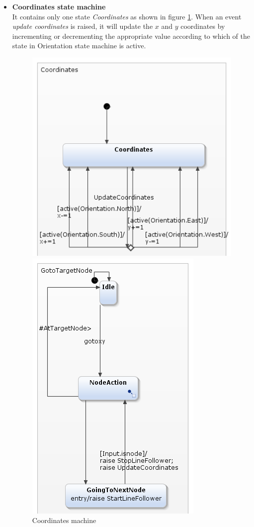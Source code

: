 \documentclass[a4paper,12pt,oneside]{book}
\begin{document}
\begin{itemize}
\item \textbf{Coordinates state machine} \\
It contains only one state \textit{Coordinates} as shown in figure \ref{coordinates}. When an event \textit{update coordinates} is raised, it will update the $x$ and $y$ coordinates by incrementing or decrementing the appropriate value according to which of the state in Orientation state machine is active.
	\begin{figure}[]
		\begin{minipage}{0.45\textwidth}
	\centering
	\includegraphics[scale=.6]{coordinates.png}
	\caption{Coordinates machine}
	\label{coordinates}
	\end{minipage}
\begin{minipage}{0.45\textwidth}
		\centering
	\includegraphics[scale=.6]{GoToTargetNode.png}

\end{minipage}
\end{figure}
\end{itemize}
\end{document}
